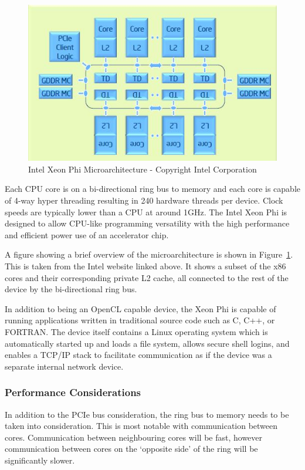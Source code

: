 \begin{figure}[H]
\centering
\includegraphics{images/intelXeonPhiMicroarchitecture.jpg}
\caption{Intel Xeon Phi Microarchitecture - Copyright Intel Corporation \textcopyright}
\label{fig:phiMicroarchitecture}
\end{figure}

Each CPU core is on a bi-directional ring bus to memory and each core is capable
of 4-way hyper threading resulting in 240 hardware threads per device. Clock
speeds are typically lower than a CPU at around 1GHz. The Intel Xeon Phi is
designed to allow CPU-like programming versatility with the high performance and
efficient power use of an accelerator chip.

A figure showing a brief overview of the microarchitecture is shown in
Figure~\ref{fig:phiMicroarchitecture}. This is taken from the Intel website
linked above. It shows a subset of the x86 cores and their corresponding private
L2 cache, all connected to the rest of the device by the bi-directional ring
bus.

In addition to being an OpenCL capable device, the Xeon Phi is capable of
running applications written in traditional source code such as C, C++, or
FORTRAN. The device itself contains a Linux operating system which is
automatically started up and loads a file system, allows secure shell logins,
and enables a TCP/IP stack to facilitate communication as if the device was a
separate internal network device.

\subsubsection{Performance Considerations}

In addition to the PCIe bus consideration, the ring bus to memory needs to be
taken into consideration. This is most notable with communication between cores.
Communication between neighbouring cores will be fast, however communication
between cores on the `opposite side' of the ring will be significantly slower.

